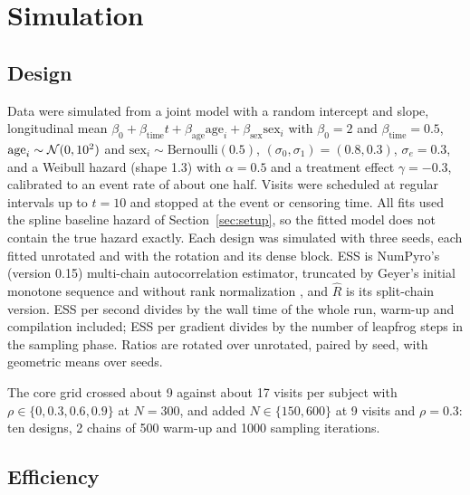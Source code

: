 \section{Simulation}\label{sec:simulation}

\subsection{Design}

Data were simulated from a joint model with a random intercept and slope,
longitudinal mean $\beta_0 + \beta_{\mathrm{time}} t +
\beta_{\mathrm{age}}\mathrm{age}_i + \beta_{\mathrm{sex}}\mathrm{sex}_i$
with $\beta_0 = 2$ and $\beta_{\mathrm{time}} = 0.5$, $\mathrm{age}_i \sim \mathcal{N}(0, 10^2)$ and $\mathrm{sex}_i \sim
\mathrm{Bernoulli}(0.5)$, $(\sigma_0, \sigma_1) = (0.8, 0.3)$, $\sigma_e = 0.3$, and a
Weibull hazard (shape 1.3) with $\alpha = 0.5$ and a treatment effect
$\gamma = -0.3$, calibrated to an event rate of about one half. Visits
were scheduled at regular intervals up to $t = 10$ and stopped at the event
or censoring time. All fits used the spline baseline hazard of
Section~\ref{sec:setup}, so the fitted model does not contain the true
hazard exactly. Each design was simulated with three seeds, each
fitted unrotated and with the rotation and its dense block. ESS is NumPyro's (version 0.15) multi-chain
autocorrelation estimator, truncated by Geyer's initial monotone sequence
and without rank normalization \citep{geyer1992,gelman2013}, and $\hat R$
is its split-chain version. ESS per second divides by the wall time of the
whole run, warm-up and compilation included; ESS per gradient divides by
the number of leapfrog steps in the sampling phase. Ratios are rotated over
unrotated, paired by seed, with geometric means over seeds.

The core grid crossed about 9 against about 17 visits per subject with
$\rho \in \{0, 0.3, 0.6, 0.9\}$ at $N = 300$, and added $N \in \{150,
600\}$ at 9 visits and $\rho = 0.3$: ten designs, 2 chains of 500 warm-up
and 1000 sampling iterations.

\subsection{Efficiency}

